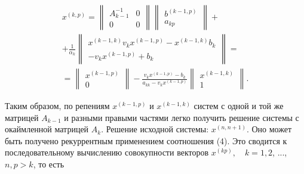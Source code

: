 \documentclass[10pt]{article}
\begin{document}
\[

\begin{gathered}

x^{(k, p)}=\left\|\begin{array}{cc}

A_{k-1}^{-1} & 0 \\

0 & 0

\end{array}\right\|\left\|\begin{array}{c}

b^{(k-1, p)} \\

a_{k p}

\end{array}\right\|+ \\

+\frac{1}{\alpha_{k}}\left\|\begin{array}{c}

x^{(k-1, k)} v_{k} x^{(k-1, p)}-x^{(k-1, k)} b_{k} \\

-v_{k} x^{(k-1, p)}+b_{k}

\end{array}\right\|= \\

=\left\|\begin{array}{c}

x^{(k-1, p)} \\

0

\end{array}\right\|-\frac{v_{k} x^{(k-1, p)}-b_{k}}{a_{k k}-v_{k} x^{(k-1, p)}}\left\|\begin{array}{c}

x^{(k-1, k)} \\

1

\end{array}\right\| .

\end{gathered}

\]



Таким образом, по репениям $x^{(k-1, p)}$ и $x^{(k-1, k)}$ систем с одной и той же матрицей $A_{k-1}$ и разными правыми частями легко получить решение системы с окаймленной матрицей $A_{k}$. Решение исходной системы: $x^{(n, n+1)}$. Оно может быть получено рекуррентным применением соотношения (4). Это сводится к последовательному вычислению совокупности векторов $x^{(k p)}, \quad k=1,2$, ..., $n, p>k$, то есть
\end{document}
